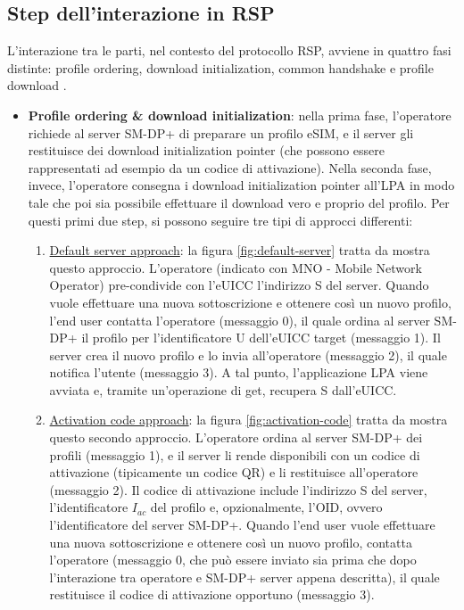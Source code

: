 \documentclass[10pt, twoside, openany]{book}
\begin{document}
\subsection{Step dell'interazione in RSP}
L'interazione tra le parti, nel contesto del protocollo RSP, avviene in quattro fasi distinte: profile ordering, download initialization, common handshake e profile download \cite{Sec-analysis}.
\begin{itemize}
\item \textbf{Profile ordering \& download initialization}: nella prima fase, l'operatore richiede al server SM-DP+ di preparare un profilo eSIM, e il server gli restituisce dei download initialization pointer (che possono essere rappresentati ad esempio da un codice di attivazione). Nella seconda fase, invece, l'operatore consegna i download initialization pointer all'LPA in modo tale che poi sia possibile effettuare il download vero e proprio del profilo. Per questi primi due step, si possono seguire tre tipi di approcci differenti:
\begin{enumerate}
\item \underline{Default server approach}: la figura \ref{fig:default-server} tratta da \cite{Sec-analysis} mostra questo approccio. L'operatore (indicato con MNO - Mobile Network Operator) pre-condivide con l'eUICC l'indirizzo S del server. Quando vuole effettuare una nuova sottoscrizione e ottenere così un nuovo profilo, l'end user contatta l'operatore (messaggio 0), il quale ordina al server SM-DP+ il profilo per l'identificatore U dell'eUICC target (messaggio 1). Il server crea il nuovo profilo e lo invia all'operatore (messaggio 2), il quale notifica l'utente (messaggio 3). A tal punto, l'applicazione LPA viene avviata e, tramite un'operazione di get, recupera S dall'eUICC.
\item \underline{Activation code approach}: la figura \ref{fig:activation-code} tratta da \cite{Sec-analysis} mostra questo secondo approccio. L'operatore ordina al server SM-DP+ dei profili (messaggio 1), e il server li rende disponibili con un codice di attivazione (tipicamente un codice QR) e li restituisce all'operatore (messaggio 2). Il codice di attivazione include l'indirizzo S del server, l'identificatore $I_{ac}$ del profilo e, opzionalmente, l'OID, ovvero l'identificatore del server SM-DP+. Quando l'end user vuole effettuare una nuova sottoscrizione e ottenere così un nuovo profilo, contatta l'operatore (messaggio 0, che può essere inviato sia prima che dopo l'interazione tra operatore e SM-DP+ server appena descritta), il quale restituisce il codice di attivazione opportuno (messaggio 3).

\end{enumerate}
\end{itemize}
\end{document}
